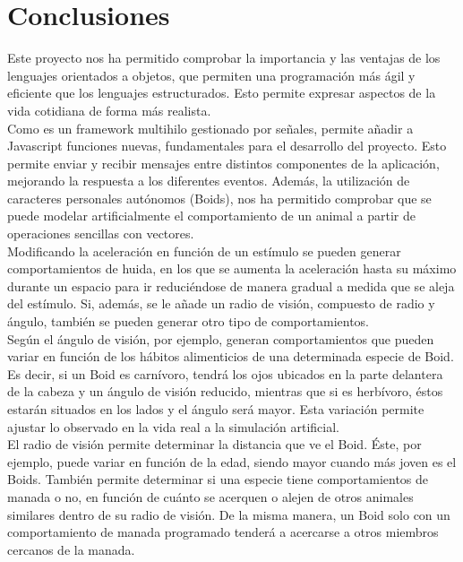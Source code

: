 \section{Conclusiones}
\label{chap:conclusiones}

Este proyecto nos ha permitido comprobar la importancia y las ventajas de los lenguajes orientados a objetos, que permiten una programación más 
ágil y eficiente que los lenguajes estructurados. Esto permite expresar aspectos de la vida cotidiana de forma más realista.\\

Como \lluvia{} es un framework multihilo gestionado por señales, permite añadir a Javascript funciones nuevas, fundamentales para el desarrollo 
del proyecto. Esto permite enviar y recibir mensajes entre distintos componentes de la aplicación, mejorando la respuesta a los diferentes 
eventos. Además, la utilización de caracteres personales autónomos (Boids), nos ha permitido comprobar que se puede modelar artificialmente el 
comportamiento de un animal a partir de operaciones sencillas con vectores.\\

Modificando la aceleración en función de un estímulo se pueden generar comportamientos de huida, en los que se aumenta la aceleración hasta 
su máximo durante un espacio para ir reduciéndose de manera gradual a medida que se aleja del estímulo.
Si, además, se le añade un radio de visión, compuesto de radio y ángulo, también se pueden generar otro tipo de comportamientos.\\

Según el ángulo de visión, por ejemplo, generan comportamientos que pueden variar en función de los hábitos alimenticios de 
una determinada especie de Boid. Es decir, si un Boid es carnívoro, tendrá los ojos ubicados en la parte delantera de la cabeza y un ángulo 
de visión reducido, mientras que si es herbívoro, éstos estarán situados en los lados y el ángulo será mayor. Esta variación permite ajustar 
lo observado en la vida real a la simulación artificial.\\

El radio de visión permite determinar la distancia que ve el Boid. Éste, por ejemplo, puede variar en función de la edad, siendo mayor cuando
más joven es el Boids. También permite determinar si una especie tiene comportamientos de manada o no, en función de cuánto se acerquen o 
alejen de otros animales similares dentro de su radio de visión. De la misma manera, un Boid solo con un comportamiento de manada programado 
tenderá a acercarse a otros miembros cercanos de la manada.\\

